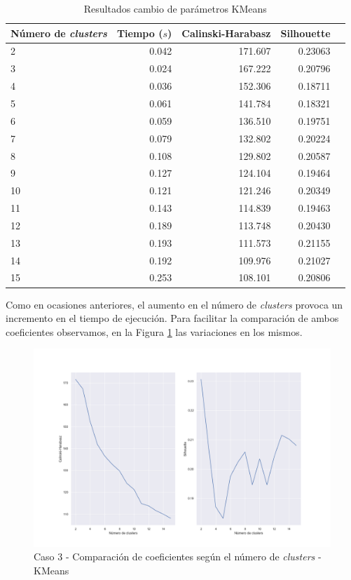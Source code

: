 \documentclass[a4paper, 20pt]{article}
\begin{document}
\begin{table}[H]
\centering
\caption{Resultados cambio de parámetros KMeans}
\label{tab:param_kmeans3}
\begin{tabular}{lrrrr}
\toprule
Número de \textit{clusters} & Tiempo ($s$) & Calinski-Harabasz & Silhouette &\\
\midrule
2 & 0.042 & 171.607 & 0.23063 \\
3 & 0.024 & 167.222 & 0.20796 \\
4 & 0.036 & 152.306 & 0.18711 \\
5 & 0.061 & 141.784 & 0.18321 \\
6 & 0.059 & 136.510 & 0.19751 \\
7 & 0.079 & 132.802 & 0.20224 \\
8 & 0.108 & 129.802 & 0.20587 \\
9 & 0.127 & 124.104 & 0.19464 \\
10 & 0.121 & 121.246 & 0.20349 \\
11 & 0.143 & 114.839 & 0.19463 \\
12 & 0.189 & 113.748 & 0.20430 \\
13 & 0.193 & 111.573 & 0.21155 \\
14 & 0.192 & 109.976 & 0.21027 \\
15 & 0.253 & 108.101 & 0.20806 \\
\bottomrule
\end{tabular}
\end{table}

Como en ocasiones anteriores, el aumento en el número de \textit{clusters} provoca un incremento en el tiempo de ejecución. Para facilitar la comparación de ambos coeficientes observamos, en la Figura \ref{fig:param_kmeans3} las variaciones en los mismos.

\begin{figure}[H]
    \centering
    \includegraphics[width=1\textwidth]{./caso3/param_kmeans}
    \caption{Caso 3 - Comparación de coeficientes según el número de \textit{clusters} - KMeans}
    \label{fig:param_kmeans3}
\end{figure}
\end{document}
